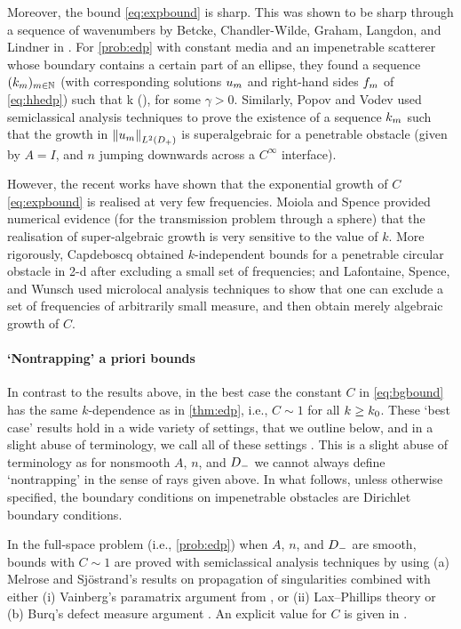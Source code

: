Moreover, the bound \eqref{eq:expbound} is sharp. This was shown to be sharp through a sequence of wavenumbers by Betcke, Chandler-Wilde, Graham, Langdon, and Lindner in \cite[Equation 2.22]{BeChGrLaLi:11}. For \cref{prob:edp} with constant media and an impenetrable scatterer whose boundary contains a certain part of an ellipse, they found a sequence $(k_{m})_{m \in \mathbb N}$ (with corresponding solutions $u_{m}$ and right-hand sides $f_{m}$ of \eqref{eq:hhedp}) such that 
\beqs
k\NLtDp{\um} \gtrsim \exp\mleft(\gamma \km\mright)\NLtDp{\fm},
\eeqs
for some $\gamma > 0$. Similarly, Popov and Vodev \cite{PoVo:99a} used semiclassical analysis techniques to prove the existence of a sequence $k_{m}$ such that the growth in $\NLtDp{\um}$ is superalgebraic for a penetrable obstacle (given by $A=I$, and $n$ jumping downwards across a $C^\infty$ interface).

However, the recent works \cite{Ca:12,MoSp:19,LaSpWu:19} have shown that the exponential growth of $C$ \cref{eq:expbound} is realised at very few frequencies. Moiola and Spence \cite{MoSp:19} provided numerical evidence (for the transmission problem through a sphere) that the realisation of super-algebraic growth is very sensitive to the value of $k$. More rigorously, Capdeboscq \cite{Ca:12} obtained $k$-independent bounds for a penetrable circular obstacle in 2-d after excluding a small set of frequencies; and Lafontaine, Spence, and Wunsch \cite{LaSpWu:19} used microlocal analysis techniques to show that one can exclude a set of frequencies of arbitrarily small measure, and then obtain merely algebraic growth of $C$.


\paragraph{`Nontrapping' a priori bounds} In contrast to the results above, in the best case the constant $C$ in \cref{eq:bgbound} has the same $k$-dependence as in \cref{thm:edp}, i.e., $C \sim 1$ for all $k\geq k_{0}$. These `best case' results hold in a wide variety of settings, that we outline below, and in a slight abuse of terminology, we call all of these settings . This is a slight abuse of terminology as for nonsmooth $A$, $n$, and $D_{-}$ we cannot always define `nontrapping' in the sense of rays given above. In what follows, unless otherwise specified, the boundary conditions on impenetrable obstacles are Dirichlet boundary conditions.

In the full-space problem (i.e., \cref{prob:edp}) when $A$, $n$, and $D_{-}$ are smooth, bounds with $C \sim 1$ are proved with semiclassical analysis techniques by using (a) Melrose and Sj\"ostrand's results on propagation of singularities \cite{MeSj:82} combined with either (i) Vainberg's paramatrix argument from \cite{Va:75}, or (ii) Lax--Phillips theory \cite{LaPh:89} or (b) Burq's defect measure argument \cite{Bu:02}. An explicit value for $C$ is given in \cite{GaSpWu:18}.

